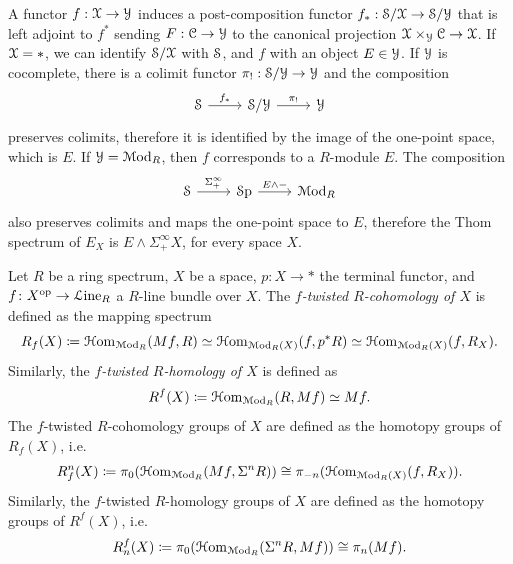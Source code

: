 \documentclass[10pt]{amsart}
\begin{document}
\begin{example} A functor $f:\mathcal{X}\to\mathcal{Y}$ induces a post-composition functor $f_*:\mathcal{S}/\mathcal{X}\to\mathcal{S}/\mathcal{Y}$ that is left adjoint to $f^*$ sending $F:\mathcal{C}\to\mathcal{Y}$ to the canonical projection $\mathcal{X}\times_{\mathcal{Y}}\mathcal{C}\to\mathcal{X}$. If $\mathcal{X}=*$, we can identify $\mathcal{S}/\mathcal{X}$ with $\mathcal{S}$, and $f$ with an object $E\in\mathcal{Y}$. If $\mathcal{Y}$ is cocomplete, there is a colimit functor $\pi_!:\mathcal{S}/\mathcal{Y}\to\mathcal{Y}$ and the composition \begin{equation}
	\begin{tikzcd}
		\lS \arrow[r,"f_*"] & \lS/\lY \arrow[r,"\pi_!"] & \lY
	\end{tikzcd}
\end{equation}preserves colimits, therefore it is identified by the image of the one-point space, which is $E$. If $\mathcal{Y}=\mathcal{M}\mathrm{od}_R$, then $f$ corresponds to a $R$-module $E$. The composition \begin{equation}
	\begin{tikzcd}
		\lS \arrow[r,"\Sigma^\infty_+"] & \Sp \arrow[r,"E\wedge-"] & \Mod_R
	\end{tikzcd}
\end{equation}also preserves colimits and maps the one-point space to $E$, therefore the Thom spectrum of $E_X$ is $E\wedge\Sigma^\infty_+X$, for every space $X$. 
\end{example}



\begin{definition} \label{def:twistedcohomology}
	Let $R$ be a ring spectrum, $X$ be a space, $p\colon X \to *$ the terminal functor, and $f\colon X^{\mathrm{op}} \to \mathcal{L}\mathrm{ine}_R$ a $R$-line bundle over $X$.  The \emph{$f$-twisted $R$-cohomology of $X$} is defined as the mapping spectrum 
	\[ R_f(X)	\coloneqq \mathcal{H}\mathrm{om}_{\mathcal{M}\mathrm{od}_R}(Mf, R) \simeq \mathcal{H}\mathrm{om}_{\mathcal{M}\mathrm{od}_R(X)}(f,p^*R) \simeq \mathcal{H}\mathrm{om}_{\mathcal{M}\mathrm{od}_R(X)}(f,R_X) .\]
	Similarly, the \emph{$f$-twisted $R$-homology of $X$} is defined as
	\[ R^f(X) \coloneqq \mathcal{H}\mathrm{om}_{\mathcal{M}\mathrm{od}_R}(R,Mf) \simeq Mf. \]
	The $f$-twisted $R$-cohomology groups of $X$ are defined as the homotopy groups of $R_f(X)$, i.e.
	\[ R^n_f(X) \coloneqq \pi_0(\mathcal{H}\mathrm{om}_{\mathcal{M}\mathrm{od}_R}(Mf, \Sigma^n R)) \cong \pi_{-n}(\mathcal{H}\mathrm{om}_{\mathcal{M}\mathrm{od}_R(X)}(f,R_X)). \]Similarly, the $f$-twisted $R$-homology groups of $X$ are defined as the homotopy groups of $R^f(X)$, i.e. 
	\[ R_n^f(X) \coloneqq \pi_0(\mathcal{H}\mathrm{om}_{\mathcal{M}\mathrm{od}_R}(\Sigma^n R, Mf)) \cong \pi_n(Mf). \]
\end{definition}
\end{document}
